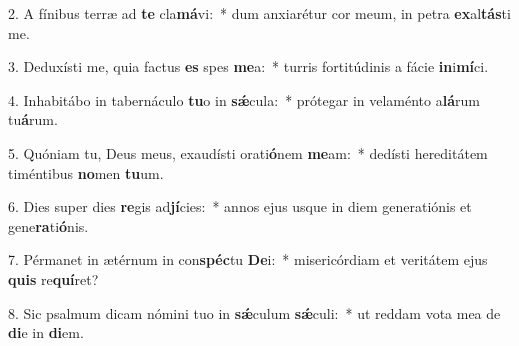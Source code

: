 2. A fínibus terræ ad \textbf{te} cla\textbf{má}vi:~*  dum anxiarétur cor meum, in petra \textbf{ex}al\textbf{tás}ti me.\

3. Deduxísti me, quia factus \textbf{es} spes \textbf{me}a:~*  turris fortitúdinis a fácie \textbf{in}i\textbf{mí}ci.\

4. Inhabitábo in tabernáculo \textbf{tu}o in \textbf{sǽ}cula:~*  prótegar in velaménto a\textbf{lá}rum tu\textbf{á}rum.\

5. Quóniam tu, Deus meus, exaudísti orati\textbf{ó}nem \textbf{me}am:~*  dedísti hereditátem timéntibus \textbf{no}men \textbf{tu}um.\

6. Dies super dies \textbf{re}gis ad\textbf{jí}cies:~*  annos ejus usque in diem generatiónis et gene\textbf{ra}ti\textbf{ó}nis.\

7. Pérmanet in ætérnum in con\textbf{spéc}tu \textbf{De}i:~*  misericórdiam et veritátem ejus \textbf{quis} re\textbf{quí}ret?\

8. Sic psalmum dicam nómini tuo in \textbf{sǽ}culum \textbf{sǽ}culi:~*  ut reddam vota mea de \textbf{di}e in \textbf{di}em.\

